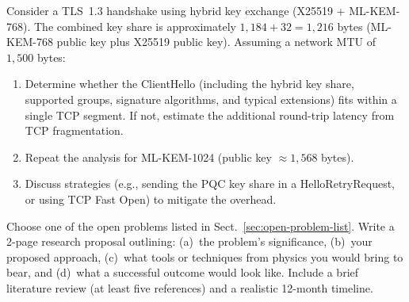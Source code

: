 \begin{prob}
\label{prob:ch15-hybrid-overhead}
Consider a TLS~1.3 handshake using hybrid key exchange (X25519 + ML-KEM-768).  The combined key share is approximately $1{,}184 + 32 = 1{,}216$ bytes (ML-KEM-768 public key plus X25519 public key).  Assuming a network MTU of $1{,}500$ bytes:
\begin{enumerate}
\item[(a)] Determine whether the ClientHello (including the hybrid key share, supported groups, signature algorithms, and typical extensions) fits within a single TCP segment.  If not, estimate the additional round-trip latency from TCP fragmentation.
\item[(b)] Repeat the analysis for ML-KEM-1024 (public key $\approx 1{,}568$ bytes).
\item[(c)] Discuss strategies (e.g., sending the PQC key share in a HelloRetryRequest, or using TCP Fast Open) to mitigate the overhead.
\end{enumerate}
\end{prob}

\begin{prob}
\label{prob:ch15-research}
Choose one of the open problems listed in Sect.~\ref{sec:open-problem-list}.  Write a 2-page research proposal outlining: (a)~the problem's significance, (b)~your proposed approach, (c)~what tools or techniques from physics you would bring to bear, and (d)~what a successful outcome would look like.  Include a brief literature review (at least five references) and a realistic 12-month timeline.
\end{prob}

